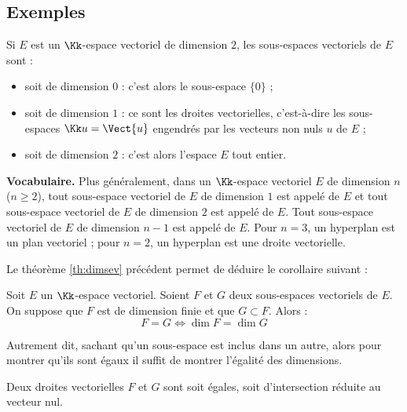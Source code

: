 \documentclass[class=report,crop=false]{standalone}
\begin{document}
\subsection{Exemples}

\begin{exemple}
Si $E$ est un $\Kk$-espace vectoriel de dimension $2$,
les sous-espaces vectoriels de $E$ sont :
\begin{itemize}
  \item soit de dimension $0$ : c'est alors le sous-espace $\{0\}$ ;

  \item soit de dimension $1$ : ce sont les droites vectorielles, c'est-à-dire
  les sous-espaces $\Kk u = \Vect \{ u \}$ engendrés par les vecteurs non nuls
  $u$ de $E$ ;

  \item soit de dimension $2$ : c'est alors l'espace $E$ tout entier.
\end{itemize}
\end{exemple}

\textbf{Vocabulaire.}
Plus généralement, dans un $\Kk$-espace vectoriel $E$ de dimension $n$ ($n \geq 2$),
tout sous-espace vectoriel de $E$ de dimension $1$ est
appelé  de $E$ et tout sous-espace vectoriel de
$E$ de dimension $2$ est appelé  de $E$.
Tout sous-espace vectoriel de $E$ de dimension $n-1$ est
appelé  de $E$.
Pour $n=3$, un hyperplan est un plan vectoriel ; pour $n=2$,
un hyperplan est une droite vectorielle.


\bigskip

Le théorème \ref{th:dimsev} précédent permet de déduire le corollaire suivant :
\begin{corollaire}
Soit $E$ un $\Kk$-espace vectoriel.
Soient $F$ et $G$ deux sous-espaces vectoriels de $E$. On suppose que $F$ est de dimension finie
et que $G \subset F$.
Alors :
$$F=G \iff \dim F = \dim G$$
\end{corollaire}
Autrement dit, sachant qu'un sous-espace est inclus dans un autre, alors
pour montrer qu'ils sont égaux il suffit de montrer l'égalité des dimensions.

\begin{exemple}
Deux droites vectorielles $F$ et $G$ sont soit égales,
soit d'intersection réduite au vecteur nul.
\end{exemple}
\end{document}
